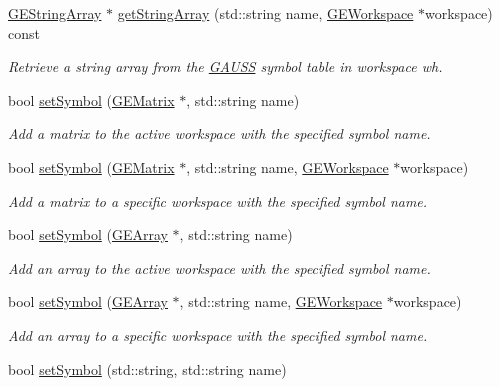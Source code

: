 \begin{DoxyCompactItemize}
\hyperlink{class_g_e_string_array}{G\+E\+String\+Array} $\ast$ \hyperlink{class_g_a_u_s_s_aa99bda725394312004da96876501a366}{get\+String\+Array} (std\+::string name, \hyperlink{class_g_e_workspace}{G\+E\+Workspace} $\ast$workspace) const
\begin{DoxyCompactList}\small\item\em Retrieve a string array from the \hyperlink{class_g_a_u_s_s}{G\+A\+U\+SS} symbol table in workspace {\itshape wh}. \end{DoxyCompactList}\item 
bool \hyperlink{class_g_a_u_s_s_ab51cbcd5a66ba3355f52bf10bf31f7e3}{set\+Symbol} (\hyperlink{class_g_e_matrix}{G\+E\+Matrix} $\ast$, std\+::string name)
\begin{DoxyCompactList}\small\item\em Add a matrix to the active workspace with the specified symbol name. \end{DoxyCompactList}\item 
bool \hyperlink{class_g_a_u_s_s_a23181c31041882ce839f816ce56e1231}{set\+Symbol} (\hyperlink{class_g_e_matrix}{G\+E\+Matrix} $\ast$, std\+::string name, \hyperlink{class_g_e_workspace}{G\+E\+Workspace} $\ast$workspace)
\begin{DoxyCompactList}\small\item\em Add a matrix to a specific workspace with the specified symbol name. \end{DoxyCompactList}\item 
bool \hyperlink{class_g_a_u_s_s_a328c6fadd097c46b0651d1985c12759d}{set\+Symbol} (\hyperlink{class_g_e_array}{G\+E\+Array} $\ast$, std\+::string name)
\begin{DoxyCompactList}\small\item\em Add an array to the active workspace with the specified symbol name. \end{DoxyCompactList}\item 
bool \hyperlink{class_g_a_u_s_s_a0b47905610cb724bd9d6b69ef57ddc60}{set\+Symbol} (\hyperlink{class_g_e_array}{G\+E\+Array} $\ast$, std\+::string name, \hyperlink{class_g_e_workspace}{G\+E\+Workspace} $\ast$workspace)
\begin{DoxyCompactList}\small\item\em Add an array to a specific workspace with the specified symbol name. \end{DoxyCompactList}\item 
bool \hyperlink{class_g_a_u_s_s_aa37c658d30c98dd8e38a8ce682083a10}{set\+Symbol} (std\+::string, std\+::string name)

\end{DoxyCompactItemize}
